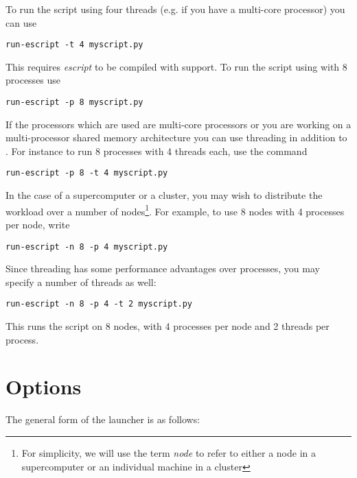 To run the script using four threads (e.g. if you have a multi-core processor)
you can use
\begin{verbatim}
run-escript -t 4 myscript.py
\end{verbatim}
This requires {\it escript} to be compiled with \OPENMP\cite{OPENMP} support.
To run the script using \MPI\cite{MPI} with 8 processes use
\begin{verbatim}
run-escript -p 8 myscript.py
\end{verbatim}
If the processors which are used are multi-core processors or you are working
on a multi-processor shared memory architecture you can use threading in
addition to \MPI.
For instance to run 8 \MPI processes with 4 threads each, use the command
\begin{verbatim}
run-escript -p 8 -t 4 myscript.py
\end{verbatim}
In the case of a supercomputer or a cluster, you may wish to distribute the
workload over a number of nodes\footnote{For simplicity, we will use the term
\emph{node} to refer to either a node in a supercomputer or an individual
machine in a cluster}.
For example, to use 8 nodes with 4 \MPI processes per node, write
\begin{verbatim}
run-escript -n 8 -p 4 myscript.py
\end{verbatim}
Since threading has some performance advantages over processes, you may
specify a number of threads as well:
\begin{verbatim}
run-escript -n 8 -p 4 -t 2 myscript.py
\end{verbatim}
This runs the script on 8 nodes, with 4 processes per node and 2 threads per process.

\section{Options}
The general form of the  launcher is as follows:



